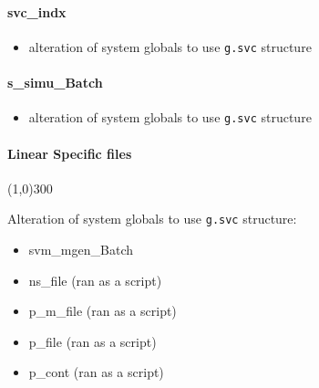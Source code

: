 \documentclass[12pt]{article}
\begin{document}
\paragraph{svc\_indx}
	\begin{itemize}
		\item alteration of system globals to use \verb|g.svc| structure
	\end{itemize}
\paragraph{s\_simu\_Batch}
	\begin{itemize}
		\item alteration of system globals to use \verb|g.svc| structure
	\end{itemize}


\paragraph{Linear Specific files}\line(1,0){300}

Alteration of system globals to use \verb|g.svc| structure:

	\begin{itemize}
		\item svm\_mgen\_Batch
		\item ns\_file (ran as a script)
		\item p\_m\_file (ran as a script)
		\item p\_file (ran as a script)
		\item p\_cont (ran as a script)
	\end{itemize}
	
	
\end{document}
